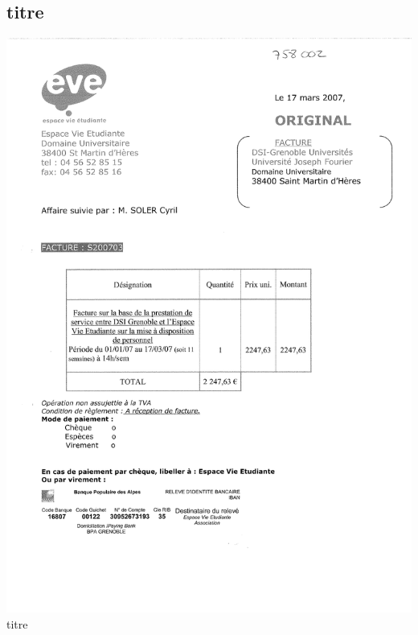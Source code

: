 \subsection{titre}
\begin{center}
\includegraphics[scale=0.6]{annexes/images/facture_client_dsi.pdf} \\
titre
\end{center}
